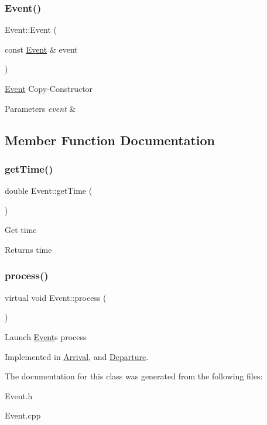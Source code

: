 \subsubsection{\texorpdfstring{Event()}{Event()}\hspace{0.1cm}{\footnotesize\ttfamily [2/2]}}
{\footnotesize\ttfamily Event\+::\+Event (\begin{DoxyParamCaption}\item[{const \hyperlink{classEvent}{Event} \&}]{event }\end{DoxyParamCaption})}

\hyperlink{classEvent}{Event} Copy-\/\+Constructor 
\begin{DoxyParams}{Parameters}
{\em event} & \\
\hline
\end{DoxyParams}


\subsection{Member Function Documentation}
\mbox{\label{classEvent_ab05b23f7cc8d126efcbf189062f3b275}} 
\subsubsection{\texorpdfstring{get\+Time()}{getTime()}}
{\footnotesize\ttfamily double Event\+::get\+Time (\begin{DoxyParamCaption}{ }\end{DoxyParamCaption})}

Get time \begin{DoxyReturn}{Returns}
time 
\end{DoxyReturn}
\mbox{\label{classEvent_af1940e82c4da67c8119f0dfe026949b4}} 
\subsubsection{\texorpdfstring{process()}{process()}}
{\footnotesize\ttfamily virtual void Event\+::process (\begin{DoxyParamCaption}{ }\end{DoxyParamCaption})\hspace{0.3cm}{\ttfamily [pure virtual]}}

Launch \hyperlink{classEvent}{Event}\textquotesingle{}s process 

Implemented in \hyperlink{classArrival_ad7da9fd4613164ece60d63be1bac6f1d}{Arrival}, and \hyperlink{classDeparture_a241611bdf4255d2ba868d58128dddc68}{Departure}.



The documentation for this class was generated from the following files\+:\begin{DoxyCompactItemize}
\item 
Event.\+h\item 
Event.\+cpp\end{DoxyCompactItemize}
